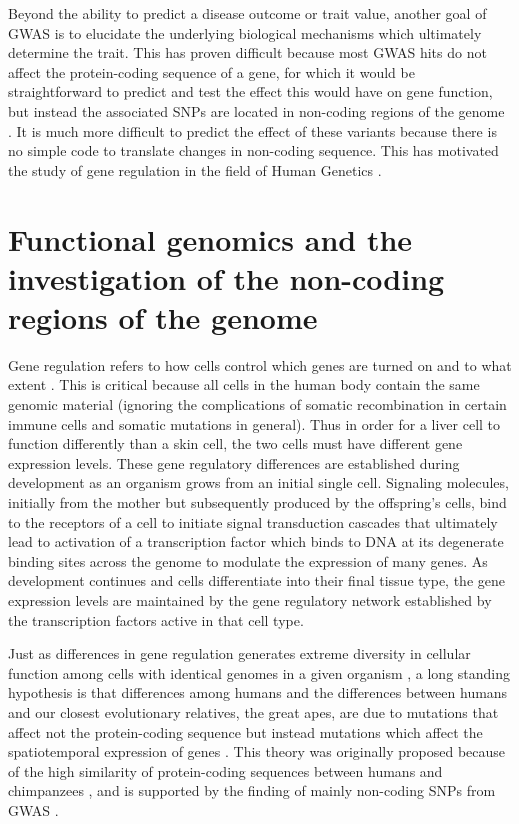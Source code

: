 Beyond the ability to predict a disease outcome or trait value,
another goal of GWAS is to elucidate the underlying biological
mechanisms which ultimately determine the trait. This has proven
difficult because most GWAS hits do not affect the protein-coding
sequence of a gene, for which it would be straightforward to predict
and test the effect this would have on gene function, but instead the
associated SNPs are located in non-coding regions of the genome \citep{Hindorff2009, Manolio2009}. It is
much more difficult to predict the effect of these variants because
there is no simple code to translate changes in non-coding
sequence. This has motivated the study of gene regulation in the field
of Human Genetics \citep{Lappalainen2010, Trynka2013, Civelek2014, Lappalainen2015}.

\section{Functional genomics and the investigation of the non-coding regions of the genome}

Gene regulation refers to how cells control which genes are turned on
and to what extent \citep{Davidson2010, Natoli2010, Strachan2011, Ostuni2013, Tsankov2015}. This is critical because all cells in the human
body contain the same genomic material (ignoring the complications of
somatic recombination in certain immune cells and somatic mutations in
general). Thus in order for a liver cell to function differently than
a skin cell, the two cells must have different gene expression
levels. These gene regulatory differences are established during
development as an organism grows from an initial single
cell. Signaling molecules, initially from the mother but subsequently
produced by the offspring’s cells, bind to the receptors of a cell to
initiate signal transduction cascades that ultimately lead to
activation of a transcription factor which binds to DNA at its
degenerate binding sites across the genome to modulate the expression
of many genes. As development continues and cells differentiate into
their final tissue type, the gene expression levels are maintained by
the gene regulatory network established by the transcription factors
active in that cell type.

Just as differences in gene regulation generates extreme diversity in
cellular function among cells with identical genomes in a given
organism \citep{Natoli2010}, a long standing hypothesis is that differences among humans
and the differences between humans and our closest evolutionary
relatives, the great apes, are due to mutations that affect not the
protein-coding sequence but instead mutations which affect the
spatiotemporal expression of genes \citep{Britten1969, King1975, Carroll2008}. This theory was originally
proposed because of the high similarity of protein-coding sequences
between humans and chimpanzees \citep{King1975}, and is supported by the finding of
mainly non-coding SNPs from GWAS \citep{Welter2014}.


